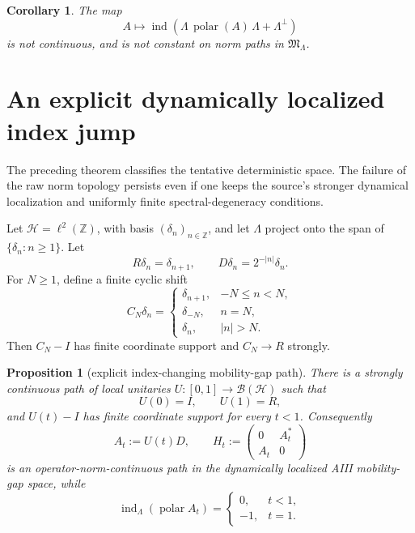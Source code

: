 \documentclass[11pt]{article}
\newtheorem{corollary}[theorem]{Corollary}
\newtheorem{proposition}[theorem]{Proposition}
\newcommand{\HH}{\mathcal H}
\newcommand{\MM}{\mathfrak M}
\newcommand{\BB}{\mathcal B}
\newcommand{\ind}{\operatorname{ind}}
\newcommand{\Z}{\mathbb Z}
\begin{document}
\begin{corollary}\label{cor:index}
The map
\[
 A\longmapsto
 \ind\!\left(\Lambda\,\operatorname{polar}(A)\,\Lambda+\Lambda^\perp\right)
\]
is not continuous, and is not constant on norm paths in
\(\MM_\Lambda\).
\end{corollary}

\section{An explicit dynamically localized index jump}

The preceding theorem classifies the tentative deterministic space.  The
failure of the raw norm topology persists even if one keeps the source's
stronger dynamical localization and uniformly finite spectral-degeneracy
conditions.

Let \(\HH=\ell^2(\Z)\), with basis \((\delta_n)_{n\in\Z}\), and let
\(\Lambda\) project onto the span of \(\{\delta_n:n\geq1\}\).  Let
\[
 R\delta_n=\delta_{n+1},\qquad
 D\delta_n=2^{-|n|}\delta_n.
\]
For \(N\geq1\), define a finite cyclic shift
\[
 C_N\delta_n=
 \begin{cases}
 \delta_{n+1},&-N\leq n<N,\\
 \delta_{-N},&n=N,\\
 \delta_n,&|n|>N.
 \end{cases}
\]
Then \(C_N-I\) has finite coordinate support and \(C_N\to R\) strongly.

\begin{proposition}[explicit index-changing mobility-gap path]\label{prop:explicit}
There is a strongly continuous path of local unitaries
\(U:[0,1]\to\BB(\HH)\) such that
\[
 U(0)=I,\qquad U(1)=R,
\]
and \(U(t)-I\) has finite coordinate support for every \(t<1\).
Consequently
\[
 A_t:=U(t)D,\qquad
 H_t:=\begin{pmatrix}0&A_t^*\\A_t&0\end{pmatrix}
\]
is an operator-norm-continuous path in the dynamically localized AIII
mobility-gap space, while
\[
 \ind_\Lambda(\operatorname{polar}A_t)=
 \begin{cases}
 0,&t<1,\\
 -1,&t=1.
 \end{cases}
\]
\end{proposition}
\end{document}

